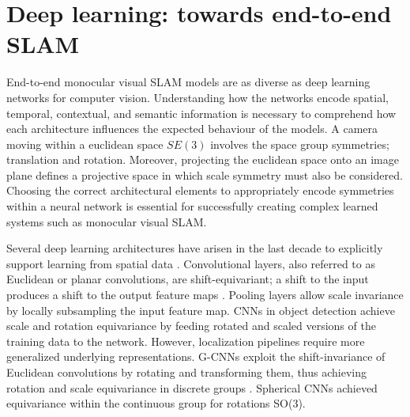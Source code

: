 \section{Deep learning: towards end-to-end SLAM}
\label{sec:deeplearning}

End-to-end monocular visual SLAM models are as diverse as deep learning networks for computer vision. Understanding how the networks encode spatial, temporal, contextual, and semantic information is necessary to comprehend how each architecture influences the expected behaviour of the models. A camera moving within a euclidean space $SE(3)$ involves the space group symmetries; translation and rotation. Moreover, projecting the euclidean space onto an image plane defines a projective space in which scale symmetry must also be considered. Choosing the correct architectural elements to appropriately encode symmetries within a neural network is essential for successfully creating complex learned systems such as monocular visual SLAM.

Several deep learning architectures have arisen in the last decade to explicitly support learning from spatial data \cite{surveyDLspatialdata}.
Convolutional layers, also referred to as Euclidean or planar convolutions, are shift-equivariant; a shift to the input produces a shift to the output feature maps \cite{bronstein2021geometricDL}. Pooling layers allow scale invariance by locally subsampling the input feature map. 
\Acp{CNN} in object detection achieve scale and rotation equivariance by feeding rotated and scaled versions of the training data to the network. However, localization pipelines require more generalized underlying representations. 
\ac{G-CNNs} exploit the shift-invariance of Euclidean convolutions  by rotating and transforming them, thus achieving rotation and scale equivariance in discrete groups \cite{dl:groupconv}. Spherical \acp{CNN} \cite{dl:sphericalCNN} achieved equivariance within the continuous group for rotations SO(3).

